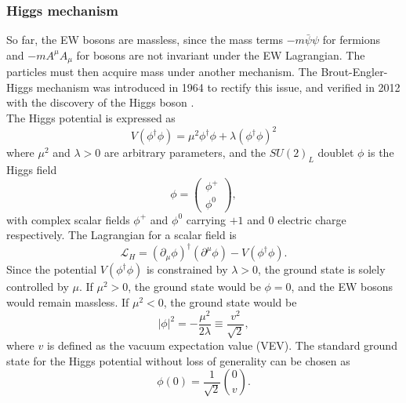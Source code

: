 \documentclass[../thesis.tex]{subfiles}
\begin{document}
\subsubsection{Higgs mechanism}
\label{sec:higgs}
So far, the \acs{EW} bosons are massless, since the mass terms $-m\bar{\psi}\psi$ for fermions and $-mA^\mu A_\mu$ for bosons are not invariant under the \acs{EW} Lagrangian. The particles must then acquire mass under another mechanism. The Brout-Engler-Higgs mechanism \citep{theory:higgs1,theory:higgs2,theory:brout_englert} was introduced in 1964 to rectify this issue, and verified in 2012 with the discovery of the Higgs boson \citep{theory:higgs_atlas,theory:higgs_cms}.\\
The Higgs potential is expressed as
\begin{equation}
V(\phi^\dagger\phi) = \mu^2\phi^\dagger\phi+\lambda(\phi^\dagger\phi)^2
\end{equation}
where $\mu^2$ and $\lambda>0$ are arbitrary parameters, and the $SU(2)_L$ doublet $\phi$ is the Higgs field
\begin{equation}
\phi = 
\begin{pmatrix}
\phi^+ \\ \phi^0
\end{pmatrix},
\end{equation}
with complex scalar fields $\phi^+$ and $\phi^0$ carrying $+1$ and $0$ electric charge respectively. The Lagrangian for a scalar field is
\begin{equation}
\mathcal{L}_H = \left(\partial_\mu \phi\right)^\dagger \left(\partial^\mu \phi\right) - V\left(\phi^\dagger\phi\right).
\end{equation}
Since the potential $V(\phi^\dagger\phi)$ is constrained by $\lambda>0$, the ground state is solely controlled by $\mu$. If $\mu^2>0$, the ground state would be $\phi=0$, and the \acs{EW} bosons would remain massless. If $\mu^2<0$, the ground state would be
\begin{equation}
|\phi|^2 = -\displaystyle\frac{\mu^2}{2\lambda} \equiv \displaystyle\frac{v^2}{\sqrt{2}},
\end{equation}
where $v$ is defined as the vacuum expectation value (\acs{VEV}). The standard ground state for the Higgs potential without loss of generality can be chosen as
\begin{equation}
\phi(0) = \frac{1}{\sqrt{2}}
\binom{0}{v}.
\end{equation}
\end{document}
